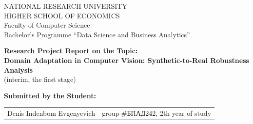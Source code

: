 \begin{titlepage}
\newpage

{
\begin{center}
NATIONAL RESEARCH UNIVERSITY\\
HIGHER SCHOOL OF ECONOMICS
\\
\bigskip
Faculty of Computer Science\\
Bachelor’s Programme “Data Science and Business Analytics”
\end{center}
}


\begin{center}
{\bf Research Project Report on the Topic:}\\
{\bf Domain Adaptation in Computer Vision: Synthetic-to-Real Robustness Analysis}\\
(interim, the first stage)
\end{center}

\vspace{2em}

{\bf Submitted by the Student: \vspace{2mm}}

{
\begin{tabular}{l@{\hskip 1.5cm}l}
Denis Indenbom Evgenyevich &
group \#\foreignlanguage{russian}{БПАД}242, 2th year of study
\end{tabular}}



\end{titlepage}

